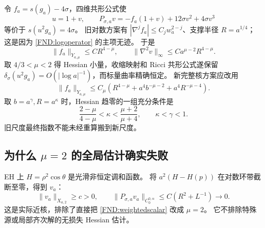 \documentclass[UTF8,fontset=fandol,zihao=-4,oneside,openany]{ctexbook}
\theoremstyle{cjkplain}
\numberwithin{equation}{chapter}
\begin{document}
令 \(f_a=s(g_a)-4\sigma\)，四维共形公式使
\[
u=1+v,\qquad
P_{\sigma,a}v=-f_a(1+v)+12\sigma v^2+4\sigma v^3
\]
等价于 \(s(u^2g_a)=4\sigma\)。
旧对数方案有
\(|\nabla^jf_a|\le C_jw_a^{2-j}\)、支撑半径 \(R=a^{1/4}\)；
这是因为 \eqref{FND:logoperator} 的主项无迹。
于是
\[
\|f_a\|_{Y_{a,\mu}}\le CR^{4-\mu},\qquad
\|\nabla^2v\|_\infty\le
Ca^{\mu-2}R^{4-\mu}.
\]
取 \(4/3<\mu<2\) 得 Hessian 小量，收缩映射和 Ricci 共形公式遂保留
\(\delta_\sigma(u^2g_a)=O(|\log a|^{-1})\)，而标量曲率精确恒定。
新完整核方案应改用
\[
\|f_a\|_{Y_{a,\mu}}
\le C_\mu\left(R^{4-\mu}
+a^4b^{-\mu-2}+a^4R^{-\mu-4}\right).
\]
取 \(b=a^\gamma,R=a^\kappa\) 时，Hessian 趋零的一组充分条件是
\[
\frac{2-\mu}{4-\mu}<\kappa<\frac{\mu+2}{\mu+4},
\qquad \kappa<\gamma<1.
\]
旧尺度最终指数不能未经重算搬到新尺度。

\subsection{为什么 \texorpdfstring{$\mu=2$}{μ=2} 的全局估计确实失败}
EH 上 \(H=\rho^2\cos\theta\) 是光滑非恒定调和函数。
将 \(a^2(H-H(p))\) 在对数环带截断至零，得到 \(v_a\)：
\[
\|v_a\|_{X_{a,2}}\ge c>0,\qquad
\|P_{\sigma,a}v_a\|_{C^{0,\alpha}_0}
\le C(R^2+L^{-1})\to0 .
\]
这是实际近核，排除了直接把 \eqref{FND:weightedscalar} 改成 \(\mu=2\)。
它不排除特殊源或局部齐次解的无损失 Hessian 估计。
\end{document}
